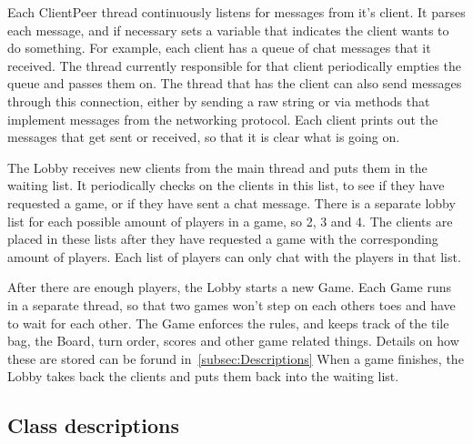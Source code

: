 \documentclass[12pt, letterpaper]{article}
\begin{document}
    Each ClientPeer thread continuously listens for messages from it's client.
    It parses each message, and if necessary sets a variable that indicates the client wants to do something.
    For example, each client has a queue of chat messages that it received.
    The thread currently responsible for that client periodically empties the queue and passes them on.
    The thread that has the client can also send messages through this connection, either by sending a raw string
    or via methods that implement messages from the networking protocol.
    Each client prints out the messages that get sent or received, so that it is clear what is going on.

    The Lobby receives new clients from the main thread and puts them in the waiting list.
    It periodically checks on the clients in this list, to see if they have requested a game, or if they have
    sent a chat message.
    There is a separate lobby list for each possible amount of players in a game, so 2, 3 and 4.
    The clients are placed in these lists after they have requested a game with the corresponding amount of players.
    Each list of players can only chat with the players in that list.

    After there are enough players, the Lobby starts a new Game.
    Each Game runs in a separate thread, so that two games won't step on each others toes
    and have to wait for each other.
    The Game enforces the rules, and keeps track of the tile bag, the Board, turn order, scores and other game
    related things.
    Details on how these are stored can be forund in~\autoref{subsec:Descriptions}
    When a game finishes, the Lobby takes back the clients and puts them back into the waiting list.


    \subsection{Class descriptions}
    \label{subsec:Descriptions}


\end{document}
